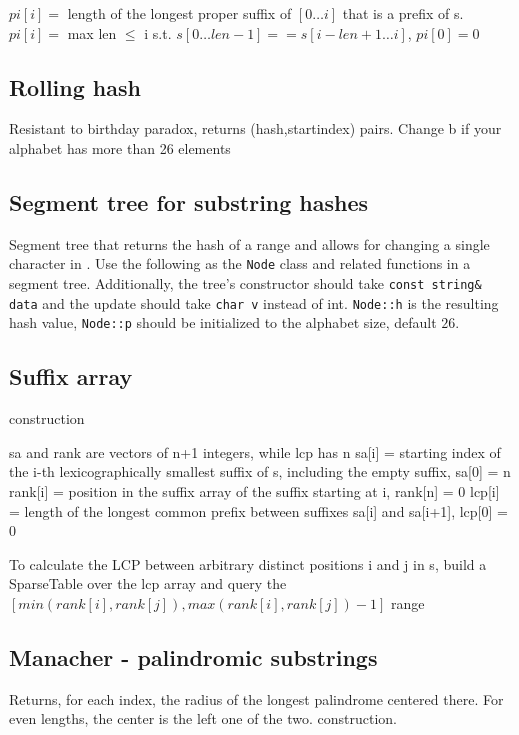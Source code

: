 $pi[i] =$ length of the longest proper suffix of $[0 \ldots i]$ that is a prefix of s. \\
$pi[i] =$ max len $\leq$ i s.t. $s[0\ldots len-1] == s[i-len+1 \ldots i]$, $pi[0]=0$

\subsection{Rolling hash}
Resistant to birthday paradox, returns (hash,startindex) pairs. Change b if your alphabet has more than 26 elements

\subsection{Segment tree for substring hashes}

Segment tree that returns the hash of a range and allows for changing a single character in . Use the following as the \verb|Node| class and related functions in a segment tree. Additionally, the tree's constructor should take \verb|const string& data| and the update should take \verb|char v| instead of int. \verb|Node::h| is the resulting hash value, \verb|Node::p| should be initialized to the alphabet size, default $26$.


\subsection{Suffix array}
 construction

sa and rank are vectors of n+1 integers, while lcp has n
sa[i] = starting index of the i-th lexicographically
  smallest suffix of s, including the empty suffix, sa[0] = n
rank[i] = position in the suffix array of the suffix starting at i, rank[n] = 0
lcp[i] = length of the longest common prefix between
  suffixes sa[i] and sa[i+1], lcp[0] = 0

To calculate the LCP between arbitrary distinct positions i and j in s, build a SparseTable over the lcp array and query the $[min(rank[i],rank[j]),max(rank[i],rank[j])-1]$ range

\subsection{Manacher - palindromic substrings}
Returns, for each index, the radius of the longest palindrome centered there. For even lengths, the center is the left one of the two.  construction.

